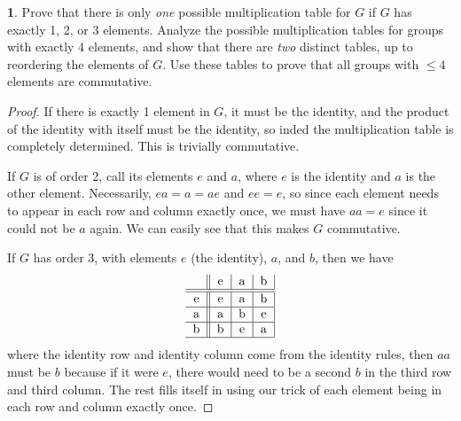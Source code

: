 \documentclass{article}
\theoremstyle{definition}
\newtheorem{ex}{}[section]
\begin{document}
\begin{ex}
	Prove that there is only \textit{one} possible multiplication table for $G$ if $G$ has exactly 1, 2, or 3 elements.
	Analyze the possible multiplication tables for groups with exactly 4 elements, and show that there are \textit{two} distinct tables, up to reordering the elements of $G$.
	Use these tables to prove that all groups with $\leq 4$ elements are commutative.
\end{ex}
\begin{proof}
	If there is exactly 1 element in $G$, it must be the identity, and the product of the identity with itself must be the identity, so inded the multiplication table is completely determined.
	This is trivially commutative.

	If $G$ is of order 2, call its elements $e$ and $a$, where $e$ is the identity and $a$ is the other element.
	Necessarily, $ea = a = ae$ and $ee = e$, so since each element needs to appear in each row and column exactly once, we must have $aa = e$ since it could not be $a$ again.
	We can easily see that this makes $G$ commutative.

	If $G$ has order 3, with elements $e$ (the identity), $a$, and $b$, then we have \begin{equation*}
		\begin{tabular}{ c || c | c | c |}
			  & e & a & b \\ \hline\hline
			e & e & a & b \\ \hline
			a & a & b & e \\ \hline
			b & b & e & a \\ \hline
		\end{tabular}
	\end{equation*}
	where the identity row and identity column come from the identity rules, then $aa$ must be $b$ because if it were $e$, there would need to be a second $b$ in the third row and third column.
	The rest fills itself in using our trick of each element being in each row and column exactly once.


\end{proof}
\end{document}
